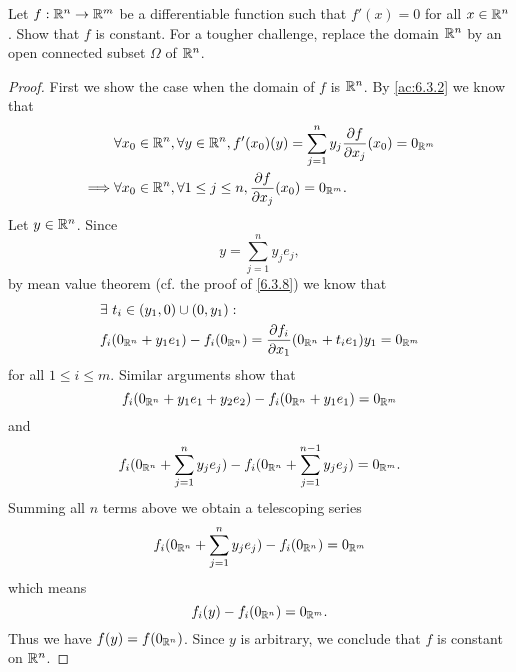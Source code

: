 \begin{ex}\label{ex:6.3.4}
  Let \(f : \mathbb{R}^n \to \mathbb{R}^m\) be a differentiable function such that \(f'(x) = 0\) for all \(x \in \mathbb{R}^n\).
  Show that \(f\) is constant.
  For a tougher challenge, replace the domain \(\mathbb{R}^n\) by an open connected subset \(\Omega\) of \(\mathbb{R}^n\).
\end{ex}

\begin{proof}
  First we show the case when the domain of \(f\) is \(\mathbb{R}^n\).
  By \cref{ac:6.3.2} we know that
  \begin{align*}
             & \forall x_0 \in \mathbb{R}^n, \forall y \in \mathbb{R}^n, f'(x_0)(y) = \sum_{j = 1}^n y_j \frac{\partial f}{\partial x_j}(x_0) = 0_{\mathbb{R}^m} \\
    \implies & \forall x_0 \in \mathbb{R}^n, \forall 1 \leq j \leq n, \frac{\partial f}{\partial x_j}(x_0) = 0_{\mathbb{R}^m}.
  \end{align*}
  Let \(y \in \mathbb{R}^n\).
  Since
  \[
    y = \sum_{j = 1}^n y_j e_j,
  \]
  by mean value theorem (cf. the proof of \cref{6.3.8}) we know that
  \begin{align*}
     & \exists\ t_i \in (y_1, 0) \cup (0, y_1) :                                                                      \\
     & f_i(0_{\mathbb{R}^n} + y_1 e_1) - f_i(0_{\mathbb{R}^n}) = \frac{\partial f_i}{\partial x_1}(0_{\mathbb{R}^n} + t_i e_1) y_1 = 0_{\mathbb{R}^m}
  \end{align*}
  for all \(1 \leq i \leq m\).
  Similar arguments show that
  \[
    f_i(0_{\mathbb{R}^n} + y_1 e_1 + y_2 e_2) - f_i(0_{\mathbb{R}^n} + y_1 e_1) = 0_{\mathbb{R}^m}
  \]
  and
  \[
    f_i(0_{\mathbb{R}^n} + \sum_{j = 1}^n y_j e_j) - f_i(0_{\mathbb{R}^n} + \sum_{j = 1}^{n - 1} y_j e_j) = 0_{\mathbb{R}^m}.
  \]
  Summing all \(n\) terms above we obtain a telescoping series
  \[
    f_i(0_{\mathbb{R}^n} + \sum_{j = 1}^n y_j e_j) - f_i(0_{\mathbb{R}^n}) = 0_{\mathbb{R}^m}
  \]
  which means
  \[
    f_i(y) - f_i(0_{\mathbb{R}^n}) = 0_{\mathbb{R}^m}.
  \]
  Thus we have \(f(y) = f(0_{\mathbb{R}^n})\).
  Since \(y\) is arbitrary, we conclude that \(f\) is constant on \(\mathbb{R}^n\).


\end{proof}

